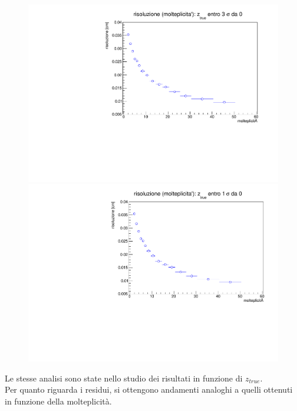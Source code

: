 \documentclass{article}
\begin{document}
\begin{figure}[H]
	\includegraphics[scale=0.4]{rismultifunc3sigma}
	
	\endminipage\hfill
	\includegraphics[scale=0.42]{rismultifunc1sigma}
	
	\endminipage
	
	
\end{figure}
\noindent
Le stesse analisi sono state nello studio dei risultati in funzione di $z_{true}$.
\\
Per quanto riguarda i residui, si ottengono andamenti analoghi a quelli ottenuti in funzione della molteplicità.
\end{document}
